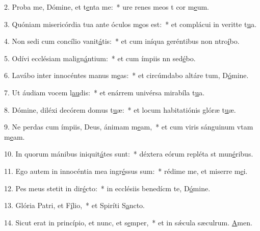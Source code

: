 2. Proba me, Dómine, et t\uline{e}nta me:~* ure renes meos t cor m\uline{e}um.\par 
3. Quóniam misericórdia tua ante óculos m\uline{e}os est:~* et complácui in veritte t\uline{u}a.\par 
4. Non sedi cum concílio vanit\uline{á}tis:~* et cum iníqua geréntibus non ntro\uline{í}bo.\par 
5. Odívi ecclésiam malign\uline{á}ntium:~* et cum ímpiis nn sed\uline{é}bo.\par 
6. Lavábo inter innocéntes manus m\uline{e}as:~* et circúmdabo altáre tum, D\uline{ó}mine.\par 
7. Ut áudiam vocem l\uline{au}dis:~* et enárrem univérsa mirabíla t\uline{u}a.\par 
8. Dómine, diléxi decórem domus t\uline{u}æ:~* et locum habitatiónis glóræ t\uline{u}æ.\par 
9. Ne perdas cum ímpiis, Deus, ánimam m\uline{e}am,~* et cum viris sánguinum vtam m\uline{e}am.\par 
10. In quorum mánibus iniquit\uline{á}tes sunt:~* déxtera eórum repléta st mun\uline{é}ribus.\par 
11. Ego autem in innocéntia mea ingr\uline{é}ssus sum:~* rédime me, et miserre m\uline{e}i.\par 
12. Pes meus stetit in dir\uline{é}cto:~* in ecclésiis benedícm te, D\uline{ó}mine.\par 
13. Glória Patri, et F\uline{í}lio,~* et Spiríti S\uline{a}ncto.\par 
14. Sicut erat in princípio, et nunc, et s\uline{e}mper,~* et in sǽcula sæculrum. \uline{A}men.\par 
